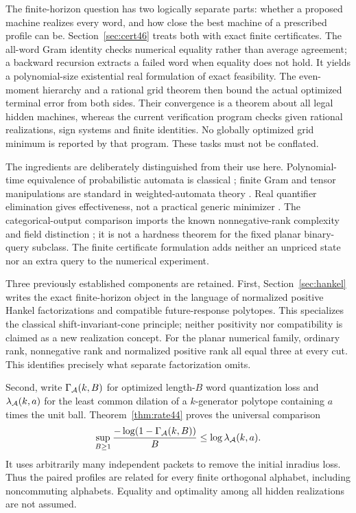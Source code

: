 The finite-horizon question has two logically separate parts: whether a
proposed machine realizes every word, and how close the best machine
of a prescribed profile can be. Section~\ref{sec:cert46} treats both
with exact finite certificates. The all-word Gram identity checks
numerical equality rather than average agreement; a backward recursion
extracts a failed word when equality does not hold. It yields a
polynomial-size existential real formulation of exact feasibility.
The even-moment hierarchy and a rational grid theorem then bound the
actual optimized terminal error from both sides. Their convergence
is a theorem about all legal hidden machines, whereas the current verification program checks given rational
realizations, sign systems and finite identities. No globally optimized
grid minimum is reported by that program.
These tasks must not be conflated.

The ingredients are deliberately distinguished from their use here.
Polynomial-time equivalence of probabilistic automata is classical
\cite{Tzeng92}; finite Gram and tensor manipulations are standard in
weighted-automata theory \cite{BPP15}. Real quantifier elimination gives
effectiveness, not a practical generic minimizer \cite{BPR}. The
categorical-output comparison imports the known nonnegative-rank
complexity and field distinction \cite{Shitov18}; it is not a hardness
theorem for the fixed planar binary-query subclass. The finite
certificate formulation adds neither an unpriced state nor an extra
query to the numerical experiment.

Three previously established components are retained. First,
Section~\ref{sec:hankel} writes the exact finite-horizon object in the
language of normalized positive Hankel factorizations and compatible
future-response polytopes. This specializes the classical
shift-invariant-cone principle; neither positivity nor compatibility is
claimed as a new realization concept. For the planar numerical family,
ordinary rank, nonnegative rank and normalized positive rank all equal
three at every cut. This identifies precisely what separate
factorization omits.

Second, write $\Gamma_{\mathcal A}(k,B)$ for optimized length-$B$ word
quantization loss and $\lambda_{\mathcal A}(k,a)$ for the least common
dilation of a $k$-generator polytope containing $a$ times the unit ball.
Theorem~\ref{thm:rate44} proves the universal comparison
\begin{equation}\label{eq:intro-rate44}
 \sup_{B\ge1}\frac{-\log(1-\Gamma_{\mathcal A}(k,B))}{B}
       \le \log\lambda_{\mathcal A}(k,a).
\end{equation}
It uses arbitrarily many independent packets to remove the initial
inradius loss. Thus the paired profiles are related for every finite
orthogonal alphabet, including noncommuting alphabets. Equality and
optimality among all hidden realizations are not assumed.

